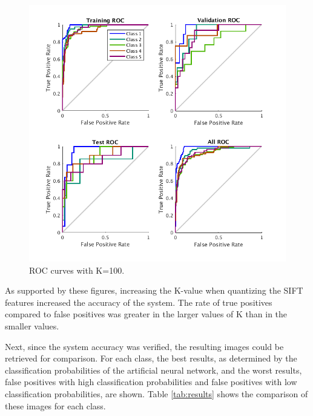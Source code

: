 \documentclass{article}
\begin{document}
\begin{figure}[Ht]
\centering
\includegraphics[scale=0.5]{Figures/Metrics/roc_k100}
\caption{ROC curves with K=100.}
\label{fig:r100}
\end{figure}
%

As supported by these figures, increasing the K-value when quantizing the SIFT features increased the accuracy of the system. The rate of true positives compared to false positives was greater in the larger values of K than in the smaller values.

Next, since the system accuracy was verified, the resulting images could be retrieved for comparison. For each class, the best results, as determined by the classification probabilities of the artificial neural network, and the worst results, false positives with high classification probabilities and false positives with low classification probabilities, are shown. Table \ref{tab:results} shows the comparison of these images for each class.
\end{document}
